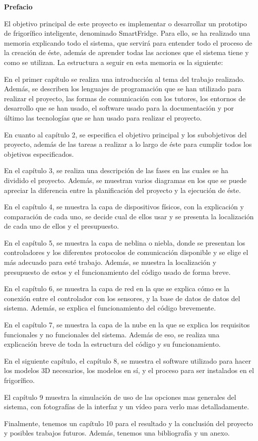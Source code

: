 {\huge \textbf{Prefacio}}

\vspace{1cm}

El objetivo principal de este proyecto es implementar o desarrollar un prototipo de frigorífico inteligente, denominado SmartFridge. Para ello, se ha realizado una memoria explicando todo el sistema, que servirá para entender todo el proceso de la creación de éste, además de aprender todas las acciones que el sistema tiene y como se utilizan. La estructura a seguir en esta memoria es la siguiente:

En el primer capítulo se realiza una introducción al tema del trabajo realizado. Además, se describen los lenguajes de programación que se han utilizado para realizar el proyecto, las formas de comunicación con los tutores, los entornos de desarrollo que se han usado, el software usado para la documentación y por último las tecnologías que se han usado para realizar el proyecto.

En cuanto al capítulo 2, se especifica el objetivo principal y los subobjetivos del proyecto, además de las tareas a realizar a lo largo de éste para cumplir todos los objetivos especificados.

En el capítulo 3, se realiza una descripción de las fases en las cuales se ha dividido el proyecto. Además, se muestran varios diagramas en los que se puede apreciar la diferencia entre la planificación del proyecto y la ejecución de éste.

En el capítulo 4, se muestra la capa de dispositivos físicos, con la explicación y comparación de cada uno, se decide cual de ellos usar y se presenta la localización de cada uno de ellos y el presupuesto.

En el capítulo 5, se muestra la capa de neblina o niebla, donde se presentan los controladores y los diferentes protocolos de comunicación disponible y se elige el más adecuado para esté trabajo. Además, se muestra la localización y presupuesto de estos y el funcionamiento del código usado de forma breve.

En el capítulo 6, se muestra la capa de red en la que se explica cómo es la conexión entre el controlador con los sensores, y la base de datos de datos del sistema. Además, se explica el funcionamiento del código brevemente.

En el capítulo 7, se muestra la capa de la nube en la que se explica los requisitos funcionales y no funcionales del sistema. Además de eso, se realiza una explicación breve de toda la estructura del código y su funcionamiento.

En el siguiente capítulo, el capítulo 8, se muestra el software utilizado para hacer los modelos 3D necesarios, los modelos en sí, y el proceso para ser instalados en el frigorífico.

El capítulo 9 muestra la simulación de uso de las opciones mas generales del sistema, con fotografías de la interfaz y un vídeo para verlo mas detalladamente.

Finalmente, tenemos un capítulo 10 para el resultado y la conclusión del proyecto y posibles trabajos futuros. Además, tenemos una bibliografía y un anexo.